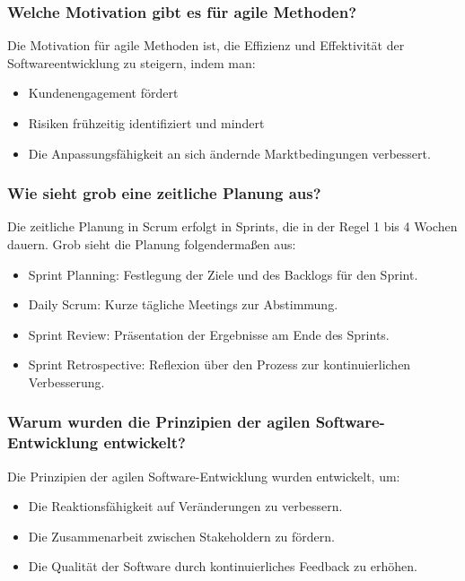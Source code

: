 \documentclass[main.tex]{subfiles}
\begin{document}
\subsubsection*{Welche Motivation gibt es für agile Methoden?}
Die Motivation für agile Methoden ist, die Effizienz und Effektivität der Softwareentwicklung zu steigern, indem man:
\begin{itemize}
    \item Kundenengagement fördert
    \item Risiken frühzeitig identifiziert und mindert
    \item Die Anpassungsfähigkeit an sich ändernde Marktbedingungen verbessert.
\end{itemize}

\subsubsection*{Wie sieht grob eine zeitliche Planung aus?}
Die zeitliche Planung in Scrum erfolgt in \glspl{Sprint}, die in der Regel 1 bis 4 Wochen dauern. Grob sieht die Planung folgendermaßen aus:
\begin{itemize}
    \item \gls{Sprint Planning}: Festlegung der Ziele und des Backlogs für den \gls{Sprint}.
    \item \gls{Daily Scrum}: Kurze tägliche Meetings zur Abstimmung.
    \item \gls{Sprint Review}: Präsentation der Ergebnisse am Ende des \glspl{Sprint}.
    \item \gls{Sprint Retrospective}: Reflexion über den Prozess zur kontinuierlichen Verbesserung.
\end{itemize}

\subsubsection*{Warum wurden die Prinzipien der agilen Software-Entwicklung entwickelt?}
Die Prinzipien der agilen Software-Entwicklung wurden entwickelt, um:
\begin{itemize}
    \item Die Reaktionsfähigkeit auf Veränderungen zu verbessern.
    \item Die Zusammenarbeit zwischen Stakeholdern zu fördern.
    \item Die Qualität der Software durch kontinuierliches Feedback zu erhöhen.
\end{itemize}
\end{document}

